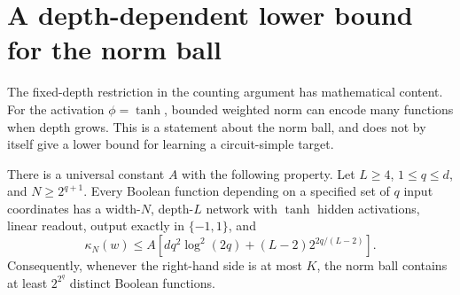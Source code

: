 \section{A depth-dependent lower bound for the norm ball}
\label{app:depth-lower-bound}
The fixed-depth restriction in the counting argument has mathematical content.
For the activation $\phi=\tanh$, bounded weighted norm can encode many functions
when depth grows.  This is a statement about the norm ball, and does not by
itself give a lower bound for learning a circuit-simple target.

\begin{proposition}\label{prop:depth-lower-bound}
There is a universal constant $A$ with the following property.  Let $L\geq4$,
$1\leq q\leq d$, and $N\geq2^{q+1}$.  Every Boolean function depending on a
specified set of $q$ input coordinates has a width-$N$, depth-$L$ network with
$\tanh$ hidden activations, linear readout, output exactly in $\{-1,1\}$,
and
\[
 \kappa_N(w)\leq A\left[dq^2\log^2(2q)
             +(L-2)2^{2q/(L-2)}\right].
\]
Consequently, whenever the right-hand side is at most $K$, the norm ball
contains at least $2^{2^q}$ distinct Boolean functions.
\end{proposition}

